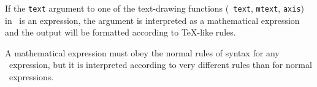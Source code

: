
If the {\tt text} argument to one of the text-drawing functions ({\tt
text}, {\tt mtext}, {\tt axis}) in \R\ is an expression, the argument
is interpreted as a mathematical expression and the output will be
formatted according to \TeX -like rules.

A mathematical expression must obey the normal rules of syntax for
any \R\ expression, but it is interpreted according to very
different rules than for normal \R\ expressions.

